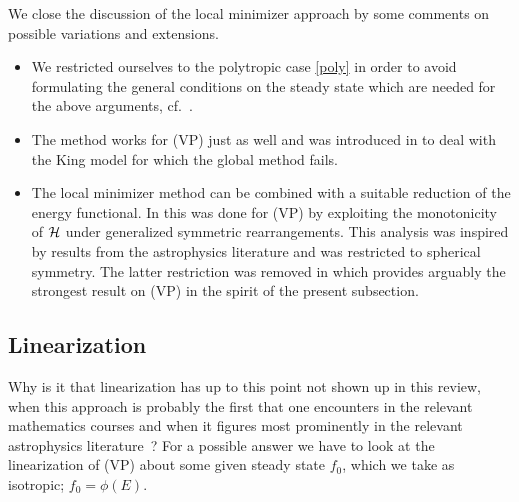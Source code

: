 \documentclass[11pt]{article}
\begin{document}
We close the discussion of the local minimizer approach by some comments on
possible variations and extensions.
%
\begin{remark}
  \begin{itemize}
  \item[(a)]
    We restricted ourselves to the polytropic case \eqref{poly} in order to
    avoid formulating the general conditions on the steady state
    which are needed for the above arguments, cf.~\cite{HaRe2007}.
  \item[(b)]
    The method works for (VP) just as well and was introduced in \cite{GuRe2007}
    to deal with the King model for which the global method fails.
  \item[(c)]
    The local minimizer method can be combined with a suitable reduction of the
    energy functional. In \cite{LeMeRa2} this was done for (VP) by
    exploiting the monotonicity of ${\cal H}$ under generalized symmetric
    rearrangements.
    This analysis was inspired by results from the astrophysics literature
    \cite{Aly1989,PerAl1996,LyBe1969,WiZiSch88} and was restricted
    to spherical symmetry. The latter restriction was removed in \cite{LeMeRa3}
    which provides arguably the strongest result on (VP) in the spirit of
    the present subsection.
  \end{itemize}
\end{remark}
%
%
\subsection{Linearization}
\label{ss_linvp}
%
Why is it that linearization has up to this point not shown up in this
review, when this approach is probably the first that one encounters in the
relevant mathematics courses and when it figures most prominently in the
relevant astrophysics literature~\cite{An1961,BiTr,DoFeBa,FrPo1984,KS}?
For a possible answer we have to look
at the linearization of (VP) about some given steady state $f_0$,
which we take as isotropic; $f_0=\phi(E)$.
\end{document}
